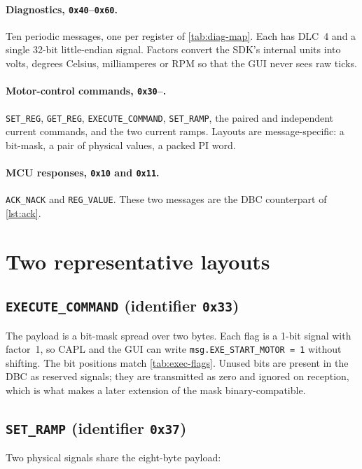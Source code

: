 \paragraph{Diagnostics, \texttt{0x40}--\texttt{0x60}.}
Ten periodic messages, one per register of \cref{tab:diag-map}. Each has
DLC~4 and a single 32-bit little-endian signal. Factors convert the SDK's
internal units into volts, degrees Celsius, milliamperes or RPM so that
the GUI never sees raw ticks.

\paragraph{Motor-control commands, \texttt{0x30}--.}
\texttt{SET\_REG}, \texttt{GET\_REG}, \texttt{EXECUTE\_COMMAND},
\texttt{SET\_RAMP}, the paired and independent current commands, and the
two current ramps. Layouts are message-specific: a bit-mask, a pair of
physical values, a packed PI word.

\paragraph{MCU responses, \texttt{0x10} and \texttt{0x11}.}
\texttt{ACK\_NACK} and \texttt{REG\_VALUE}. These two messages are the
DBC counterpart of \cref{lst:ack}.

\section{Two representative layouts}
\label{sec:layouts}

\subsection{\texttt{EXECUTE\_COMMAND} (identifier \texttt{0x33})}
The payload is a bit-mask spread over two bytes. Each flag is a 1-bit
signal with factor~1, so CAPL and the GUI can write
\texttt{msg.EXE\_START\_MOTOR = 1} without shifting. The bit positions
match \cref{tab:exec-flags}. Unused bits are present in the DBC as
reserved signals; they are transmitted as zero and ignored on reception,
which is what makes a later extension of the mask binary-compatible.

\subsection{\texttt{SET\_RAMP} (identifier \texttt{0x37})}
Two physical signals share the eight-byte payload:

